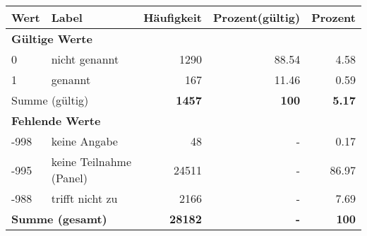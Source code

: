      \begin{longtable}{lXrrr}
     \toprule
     \textbf{Wert} & \textbf{Label} & \textbf{Häufigkeit} & \textbf{Prozent(gültig)} & \textbf{Prozent} \\
     \endhead
     \midrule
     \multicolumn{5}{l}{\textbf{Gültige Werte}}\\

     0 &
     \multicolumn{1}{X}{ nicht genannt   } &


       \num{1290} &
       \num[round-mode=places,round-precision=2]{88.54} &
         \num[round-mode=places,round-precision=2]{4.58} \\

     1 &
     \multicolumn{1}{X}{ genannt   } &


       \num{167} &
       \num[round-mode=places,round-precision=2]{11.46} &
         \num[round-mode=places,round-precision=2]{0.59} \\
     \midrule
     \multicolumn{2}{l}{Summe (gültig)} &
       \textbf{\num{1457}} &
     \textbf{100} &
       \textbf{\num[round-mode=places,round-precision=2]{5.17}} \\
     \multicolumn{5}{l}{\textbf{Fehlende Werte}}\\
       -998 &
       keine Angabe &
         \num{48} &
        - &
         \num[round-mode=places,round-precision=2]{0.17} \\
       -995 &
       keine Teilnahme (Panel) &
         \num{24511} &
        - &
         \num[round-mode=places,round-precision=2]{86.97} \\
       -988 &
       trifft nicht zu &
         \num{2166} &
        - &
         \num[round-mode=places,round-precision=2]{7.69} \\
     \midrule
     \multicolumn{2}{l}{\textbf{Summe (gesamt)}} &
          \textbf{\num{28182}} &
        \textbf{-} &
        \textbf{100} \\
     \bottomrule
     \end{longtable}
     
